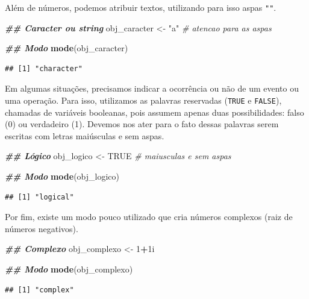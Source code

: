 \documentclass[
]{article}
\newenvironment{Shaded}{\begin{snugshade}}{\end{snugshade}}
\newcommand{\CommentTok}[1]{\textcolor[rgb]{0.56,0.35,0.01}{\textit{#1}}}
\newcommand{\ConstantTok}[1]{\textcolor[rgb]{0.56,0.35,0.01}{#1}}
\newcommand{\DecValTok}[1]{\textcolor[rgb]{0.00,0.00,0.81}{#1}}
\newcommand{\DocumentationTok}[1]{\textcolor[rgb]{0.56,0.35,0.01}{\textbf{\textit{#1}}}}
\newcommand{\FunctionTok}[1]{\textcolor[rgb]{0.13,0.29,0.53}{\textbf{#1}}}
\newcommand{\NormalTok}[1]{#1}
\newcommand{\OtherTok}[1]{\textcolor[rgb]{0.56,0.35,0.01}{#1}}
\newcommand{\SpecialCharTok}[1]{\textcolor[rgb]{0.81,0.36,0.00}{\textbf{#1}}}
\newcommand{\StringTok}[1]{\textcolor[rgb]{0.31,0.60,0.02}{#1}}
\begin{document}
Além de números, podemos atribuir textos, utilizando para isso aspas \texttt{""}.

\begin{Shaded}
\begin{Highlighting}[]
\DocumentationTok{\#\# Caracter ou string}
\NormalTok{obj\_caracter }\OtherTok{\textless{}{-}} \StringTok{"a"} \CommentTok{\# atencao para as aspas}

\DocumentationTok{\#\# Modo}
\FunctionTok{mode}\NormalTok{(obj\_caracter)}
\end{Highlighting}
\end{Shaded}

\begin{verbatim}
## [1] "character"
\end{verbatim}

Em algumas situações, precisamos indicar a ocorrência ou não de um evento ou uma operação. Para isso, utilizamos as palavras reservadas (\texttt{TRUE} e \texttt{FALSE}), chamadas de variáveis booleanas, pois assumem apenas duas possibilidades: falso (0) ou verdadeiro (1). Devemos nos ater para o fato dessas palavras serem escritas com letras maiúsculas e sem aspas.

\begin{Shaded}
\begin{Highlighting}[]
\DocumentationTok{\#\# Lógico}
\NormalTok{obj\_logico }\OtherTok{\textless{}{-}} \ConstantTok{TRUE} \CommentTok{\# maiusculas e sem aspas}

\DocumentationTok{\#\# Modo}
\FunctionTok{mode}\NormalTok{(obj\_logico)}
\end{Highlighting}
\end{Shaded}

\begin{verbatim}
## [1] "logical"
\end{verbatim}

Por fim, existe um modo pouco utilizado que cria números complexos (raiz de números negativos).

\begin{Shaded}
\begin{Highlighting}[]
\DocumentationTok{\#\# Complexo}
\NormalTok{obj\_complexo }\OtherTok{\textless{}{-}} \DecValTok{1}\SpecialCharTok{+}\NormalTok{1i}

\DocumentationTok{\#\# Modo}
\FunctionTok{mode}\NormalTok{(obj\_complexo)}
\end{Highlighting}
\end{Shaded}

\begin{verbatim}
## [1] "complex"
\end{verbatim}
\end{document}
